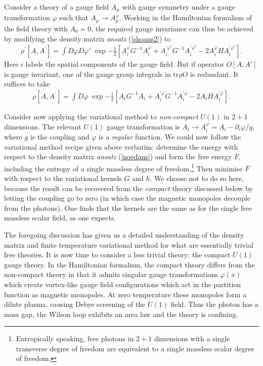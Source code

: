 \documentclass[a4paper,a4paper]{article}
\begin{document}
Consider a theory of a gauge field $A_{\mu}$ with gauge symmetry under a gauge transformation $\varphi$ such that 
$A_{\mu} \rightarrow A_{\mu}^{\varphi}$. Working in the Hamiltonian formalism of the field theory with $A_0=0$, the required gauge invariance
can thus be achieved by modifying the density matrix \emph{ansatz} (\ref{shoans2}) to
\begin{gather} \label{nqedans1}
\rho^{'} [A,A^{'}] = \int D\varphi D\varphi' \; 
\exp{-\frac{1}{2} 
\left[ A_{i}^{\varphi} G^{-1} A_{i}^{\varphi} + A_{i}^{'\varphi'} G^{-1} A_{i}^{'\varphi'} - 2 A_{i}^{\varphi} H A_{i}^{'\varphi'} \right]}.
\end{gather}
Here $i$ labels the spatial components of the gauge field.
But if operator $O[A,A']$ is gauge invariant, one of the gauge group integrals in $\mathrm{tr} \rho O$ is redundant. It suffices to take
\begin{gather} \label{nqedans}
\rho [A,A^{'}] = \int D\varphi \; 
\exp{-\frac{1}{2} \left[ A_{i} G^{-1} A_{i} + A_{i}^{'\varphi} G^{-1} A_{i}^{'\varphi} - 2 A_{i} H A_{i}^{'\varphi} \right] }.
\end{gather}

Consider now applying the variational method to \emph{non-compact} $U(1)$ in $2+1$ dimensions. 
The relevant $U(1)$ gauge transformation is $A_{i} \rightarrow A_{i}^{\varphi} = A_{i} - \partial_i \varphi / g$,
where $g$ is the coupling and $\varphi$ is a \emph{regular} function.
We could now follow the variational method recipe given above verbatim: 
determine the energy with respect to the density matrix \emph{ansatz} (\ref{nqedans}) and form the free energy $F$,
including the entropy  of a single massless degree of freedom.\footnote{Entropically speaking, free photons in $2+1$ dimensions
with a single transverse degree of freedom are equivalent to a single massless scalar degree of freedom.} 
Then minimise $F$ with respect to the variational kernels $G$ and $h$. 
We choose not to do so here, because the result can be recovered from the \emph{compact} theory discussed below by letting
the coupling go to zero (in which case the magnetic monopoles decouple from the photons).
One finds that the kernels are the same as for the single free massless scalar field, as one expects.

The foregoing discussion has given us a detailed understanding of the density matrix and finite temperature variational method
for what are essentially trivial free theories. It is now time to consider a less trivial theory: the compact $U(1)$ gauge theory.
In the Hamiltonian formalism, 
the compact theory differs from the non-compact theory in that it admits singular gauge transformations $\varphi (x)$ 
which create vortex-like gauge field configurations
which act in the partition function as magnetic monopoles.
At zero temperature these monopoles form a dilute plasma, 
causing Debye screening of the $U(1)$ field. Thus the photon has a mass gap, 
the Wilson loop exhibits an area law and the theory is confining.
\end{document}
